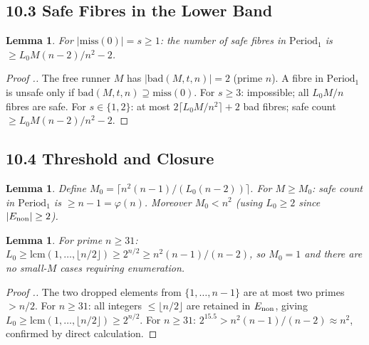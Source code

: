 \documentclass[11pt,a4paper]{article}
\theoremstyle{plain}
\newtheorem{lemma}[theorem]{Lemma}
\theoremstyle{definition}
\theoremstyle{remark}
\begin{document}
\subsection{10.3 Safe Fibres in the Lower Band}



\begin{lemma}
For $|\mathrm{miss}(0)| = s \geq 1$: the number of safe fibres in $\mathrm{Period}_1$ is $\geq L_0 M(n-2)/n^2 - 2$.

\end{lemma}

\begin{proof}[Proof .]
The free runner $M$ has $|\mathrm{bad}(M, t, n)| = 2$ (prime $n$). A fibre in $\mathrm{Period}_1$ is unsafe only if $\mathrm{bad}(M, t, n) \supseteq \mathrm{miss}(0)$. For $s \geq 3$: impossible; all $L_0M/n$ fibres are safe. For $s \in \{1,2\}$: at most $2\lceil L_0M/n^2 \rceil + 2$ bad fibres; safe count $\geq L_0M(n-2)/n^2 - 2$.
\end{proof}


\subsection{10.4 Threshold and Closure}



\begin{lemma}
Define $M_0 = \lceil n^2(n-1)/(L_0(n-2))\rceil$. For $M \geq M_0$: safe count in $\mathrm{Period}_1$ is $\geq n-1 = \varphi(n)$. Moreover $M_0 < n^2$ (using $L_0 \geq 2$ since $|E_{\rm non}| \geq 2$).

\end{lemma}


\begin{lemma}
For prime $n \geq 31$: $L_0 \geq \mathrm{lcm}(1,\ldots,\lfloor n/2 \rfloor) \geq 2^{n/2} \geq n^2(n-1)/(n-2)$, so $M_0 = 1$ and there are no small-$M$ cases requiring enumeration.

\end{lemma}

\begin{proof}[Proof .]
The two dropped elements from $\{1,\ldots,n-1\}$ are at most two primes $> n/2$. For $n \geq 31$: all integers $\leq \lfloor n/2 \rfloor$ are retained in $E_{\rm non}$, giving $L_0 \geq \mathrm{lcm}(1,\ldots,\lfloor n/2 \rfloor) \geq 2^{n/2}$. For $n \geq 31$: $2^{15.5} > n^2(n-1)/(n-2) \approx n^2$, confirmed by direct calculation.
\end{proof}
\end{document}

